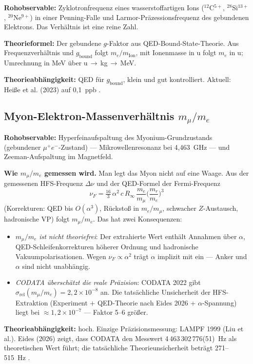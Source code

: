 \textbf{Rohobservable:} Zyklotronfrequenz eines wasserstoffartigen Ions ($^{12}$C$^{5+}$, $^{28}$Si$^{13+}$, $^{20}$Ne$^{9+}$) in einer Penning-Falle und Larmor-Präzessionsfrequenz des gebundenen Elektrons. Das Verhältnis ist eine reine Zahl.

\textbf{Theorieformel:} Der gebundene $g$-Faktor aus QED-Bound-State-Theorie. Aus Frequenzverhältnis und $g_\text{bound}$ folgt $m_e/m_\text{Ion}$, mit Ionenmasse in u folgt $m_e$ in u; Umrechnung in MeV über u\,$\to$\,kg\,$\to$\,MeV.

\textbf{Theorieabhängigkeit:} QED für $g_\text{bound}$, klein und gut kontrolliert. Aktuell: Heiße et al. (2023) auf 0{,}1~ppb \QM.

\subsection{Myon-Elektron-Massenverhältnis $m_\mu/m_e$}

\textbf{Rohobservable:} Hyperfeinaufspaltung des Myonium-Grundzustands (gebundener $\mu^+e^-$-Zustand) --- Mikrowellenresonanz bei 4{,}463~GHz --- und Zeeman-Aufspaltung im Magnetfeld.

\textbf{Wie $m_\mu/m_e$ gemessen wird.} Man legt das Myon nicht auf eine Waage.
Aus der gemessenen HFS-Frequenz $\Delta\nu$ und der QED-Formel der Fermi-Frequenz
\begin{equation}
\nu_F=\tfrac{16}{3}\,\alpha^2\,c\,R_\infty\,\frac{m_e}{m_\mu}\Big(\frac{m_r}{m_e}\Big)^3
\end{equation}
(Korrekturen: QED bis $O(\alpha^3)$, Rückstoß in $m_e/m_\mu$, schwacher $Z$-Austausch, hadronische VP) folgt $m_\mu/m_e$. Das hat zwei Konsequenzen:
\begin{itemize}\itemsep2pt
\item $m_\mu/m_e$ \emph{ist nicht theoriefrei}: Der extrahierte Wert enthält Annahmen über
  $\alpha$, QED-Schleifenkorrekturen höherer Ordnung und hadronische Vakuumpolarisationen.
  Wegen $\nu_F\propto\alpha^2$ trägt $\alpha$ implizit mit ein --- Anker und $\alpha$ sind
  nicht unabhängig.
\item \emph{CODATA überschätzt die reale Präzision}: CODATA 2022
  gibt $\sigma_\text{rel}(m_\mu/m_e)=2{,}2\times10^{-8}$ an. Die tatsächliche Unsicherheit
  der HFS-Extraktion (Experiment + QED-Theorie nach Eides 2026 + $\alpha$-Spannung)
  liegt bei $\approx1{,}2\times10^{-7}$ --- Faktor 5--6 größer. \QM{}
\end{itemize}

\textbf{Theorieabhängigkeit:} hoch. Einzige Präzisionsmessung: LAMPF 1999 (Liu et al.). Eides (2026) zeigt, dass CODATA den Messwert 4\,463\,302\,776(51)~Hz als theoretischen Wert führt; die tatsächliche Theorieunsicherheit beträgt 271--515~Hz \QM.

